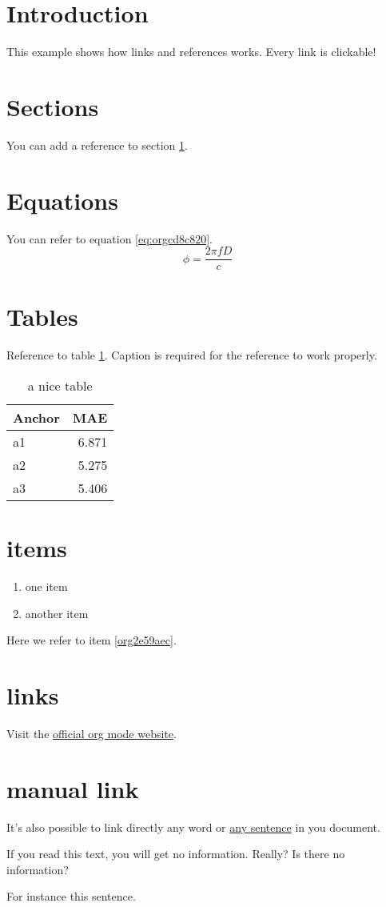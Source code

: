 


\section{Introduction}
\label{sec:org5cf8f7c}
This example shows how links and references works.
Every link is clickable!

\section{Sections}
\label{sec:orged0870e}
You can add a reference to section \ref{sec:org5cf8f7c}.

\section{Equations}
\label{sec:org4d0e956}
You can refer to equation \ref{eq:orgcd8c820}.
\begin{equation}
\label{eq:orgcd8c820}
\phi = \frac{2\pi fD}{c}
\end{equation}

\section{Tables}
\label{sec:org321c3c5}
Reference to table \ref{tab:orge5dbd2a}.
Caption is required for the reference to work properly.

\begin{table}[htbp]
\caption{\label{tab:orge5dbd2a}
a nice table}
\centering
\begin{tabular}{lr}
Anchor & MAE\\
\hline
a1 & 6.871\\
a2 & 5.275\\
a3 & 5.406\\
\end{tabular}
\end{table}

\section{items}
\label{sec:org1a93415}
\begin{enumerate}
\item one item
\item \label{org2e59aec}another item
\end{enumerate}
Here we refer to item \ref{org2e59aec}.

\section{links}
\label{sec:orgcf4ea99}
Visit the \href{https://orgmode.org/}{official org mode website}.

\section{manual link}
\label{sec:orgd2a24d2}
It's also possible to link directly any word
or \hyperlink{thesentence}{any sentence} in you document.

If you read this text, you will get no information.  Really?
Is there no information?

For instance \hypertarget{thesentence}{this sentence}.


